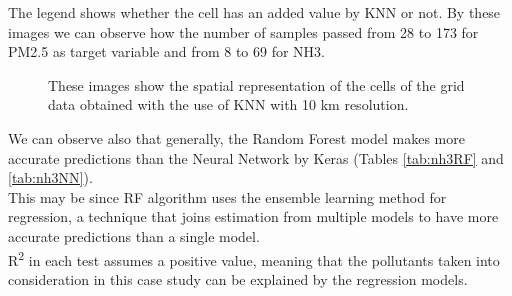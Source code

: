The legend shows whether the cell has an added value by KNN or not. By these images we can observe how the number of samples passed from 28 to 173 for PM2.5 as target variable and from 8 to 69 for NH3.
\begin{figure}[H] 
    \centering
    \hfill%
    \caption{These images show the spatial representation of the cells of the grid data obtained with the use of KNN with 10 km resolution.}
    \label{fig:comparison-sensors}
\end{figure}
We can observe also that generally, the Random Forest model makes more accurate predictions than the Neural Network by Keras (Tables \ref{tab:nh3RF} and \ref{tab:nh3NN}). \\
This may be since RF algorithm uses the ensemble learning method for regression, a technique that joins estimation from multiple models to have more accurate predictions than a single model.\\ 
R\textsuperscript{2} in each test assumes a positive value, meaning that the pollutants taken into consideration in this case study can be explained by the regression models. 
\pagebreak

